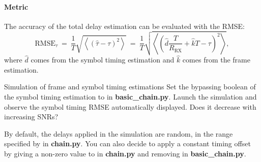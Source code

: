 \paragraph{Metric} The accuracy of the total delay estimation can be evaluated with the RMSE:
\begin{equation*}
    \text{RMSE}_{\tau}\:=\:\frac{1}{T}\sqrt{\left\langle\left(\hat{\tau}-\tau\right)^2\right\rangle}\:=\:\frac{1}{T}\sqrt{\left\langle\left(\hat{d}\frac{T}{R_{\text{RX}}}+\hat{k}T-\tau\right)^2\right\rangle},
\end{equation*}
where $\hat{d}$ comes from the symbol timing estimation and $\hat{k}$ comes from the frame estimation.



\begin{bclogo}[couleur = gray!20, arrondi = 0.2, logo=\bccrayon]{Simulation of frame and symbol timing estimations}
Set the bypassing boolean of the symbol timing estimation to  in \textbf{basic\_chain.py}. Launch the simulation and observe the symbol timing RMSE automatically displayed. Does it decrease with increasing SNRs?

By default, the delays applied in the simulation are random, in the range specified by  in \textbf{chain.py}. You can also decide to apply a constant timing offset by giving a non-zero value to  in \textbf{chain.py} and removing  in \textbf{basic\_chain.py}.

\end{bclogo}
